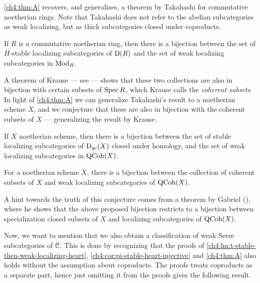 \cref{ch4:thm:A} recovers, and generalizes, a theorem by Takahashi for commutative noetherian rings. Note that Takahashi does not refer to the abelian subcategories as weak localizing, but as thick subcategories closed under coproducts. 

\begin{corollary}
    \label{ch4:cor:takahashi-weak-localizing}
    If $R$ is a commutative noetherian ring, then there is a bijection between the set of $H$-stable localizing subcategories of $\mathrm{D}(R)$ and the set of weak localizing subcategories in $\mathrm{Mod}_R$. 
\end{corollary}

A theorem of Krause --- see \cite[3.1]{krause_2008} --- shows that these two collections are also in bijection with certain subsets of $\operatorname{Spec} R$, which Krause calls the \emph{coherent subsets}. In light of \cref{ch4:thm:A} we can generalize Takahashi's result to a noetherian scheme $X$, and we conjecture that these are also in bijection with the coherent subsets of $X$ --- generalizing the result by Krause.  

\begin{corollary}
    \label{ch4:cor:noetherian-scheme-weak-localizing}
    If $X$ noetherian scheme, then there is a bijection between the set of stable localizing subcategories of $\mathrm{D}_{qc}(X)$ closed under homology, and the set of weak localizing subcategories in $\operatorname{QCoh}(X)$. 
\end{corollary}

\begin{conjecture}
    \label{ch4:conj:coherent-noetherian-scheme}
    For a noetherian scheme $X$, there is a bijection between the collection of coherent subsets of $X$ and weak localizing subcategories of $\operatorname{QCoh}(X)$. 
\end{conjecture}

\begin{remark}
    A hint towards the truth of this conjecture comes from a theorem by Gabriel (\cite[VI.2.4(b)]{gabriel_1962}), where he shows that the above proposed bijection restricts to a bijection between specialization closed subsets of $X$ and localizing subcategories of $\operatorname{QCoh}(X)$. 
\end{remark}

Now, we want to mention that we also obtain a classification of weak Serre subcategories of $\EuScript{C}$. This is done by recognizing that the proofs of \cref{ch4:lm:t-stable-then-weak-localizing-heart}, \cref{ch4:cor:pi-stable-heart-injective} and \cref{ch4:thm:A} also holds without the assumption about coproducts. The proofs treats coproducts as a separate part, hence just omitting it from the proofs gives the following result. 

